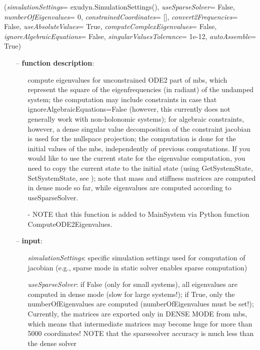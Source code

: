 %
\begin{flushleft}
\label{sec:mainsystemextensions:ComputeODE2Eigenvalues}
({\it simulationSettings}= exudyn.SimulationSettings(), {\it useSparseSolver}= False, {\it numberOfEigenvalues}= 0, {\it constrainedCoordinates}= [], {\it convert2Frequencies}= False, {\it useAbsoluteValues}= True, {\it computeComplexEigenvalues}= False, {\it ignoreAlgebraicEquations}= False, {\it singularValuesTolerance}= 1e-12, {\it autoAssemble}= True)
\end{flushleft}
\setlength{\itemindent}{0.7cm}
\begin{itemize}[leftmargin=0.7cm]
\item[--]
{\bf function description}: \vspace{-6pt}
\begin{itemize}[leftmargin=1.2cm]
\setlength{\itemindent}{-0.7cm}
\item[]compute eigenvalues for unconstrained ODE2 part of mbs, which represent the square of the eigenfrequencies (in radiant) of the undamped system; the computation may include constraints in case that ignoreAlgebraicEquations=False (however, this currently does not generally work with non-holonomic systems); for algebraic constraints, however, a dense singular value decomposition of the constraint jacobian is used for the nullspace projection; the computation is done for the initial values of the mbs, independently of previous computations. If you would like to use the current state for the eigenvalue computation, you need to copy the current state to the initial state (using GetSystemState, SetSystemState, see ); note that mass and stiffness matrices are computed in dense mode so far, while eigenvalues are computed according to useSparseSolver.
\item[]- NOTE that this function is added to MainSystem via Python function ComputeODE2Eigenvalues.
\end{itemize}
\item[--]
{\bf input}: \vspace{-6pt}
\begin{itemize}[leftmargin=1.2cm]
\setlength{\itemindent}{-0.7cm}
\item[]{\it simulationSettings}: specific simulation settings used for computation of jacobian (e.g., sparse mode in static solver enables sparse computation)
\item[]{\it useSparseSolver}: if False (only for small systems), all eigenvalues are computed in dense mode (slow for large systems!); if True, only the numberOfEigenvalues are computed (numberOfEigenvalues must be set!); Currently, the matrices are exported only in DENSE MODE from mbs, which means that intermediate matrices may become huge for more than 5000 coordinates! NOTE that the sparsesolver accuracy is much less than the dense solver

\end{itemize}
\end{itemize}
